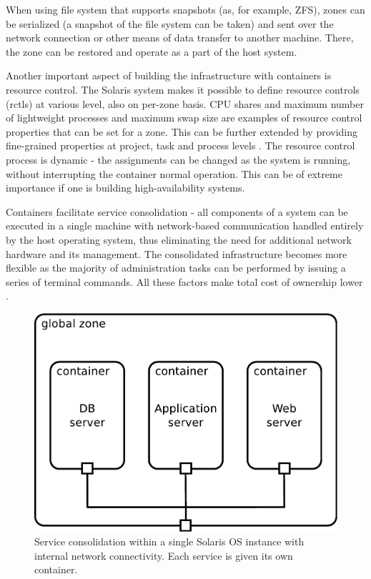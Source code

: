 \documentclass[11pt]{book}
\begin{document}
        When using file system that supports snapshots (as, for example, ZFS), zones can be
        serialized (a snapshot of the file system can be taken) and sent over the network connection or other means of
        data transfer to another machine. There, the zone can be restored and operate as a part of the host system.

        Another important aspect of building the infrastructure with containers is resource control. The Solaris system
        makes it possible to define resource controls (rctls) at various level, also on per-zone basis. CPU shares and
        maximum number of lightweight processes and maximum swap size are examples of resource control properties that
        can be set for a zone. This can be further extended by providing fine-grained properties at project, task and
        process levels \cite{sag}. The resource control process is dynamic - the assignments can be changed as the
        system is running, without interrupting the container normal operation. This can be of extreme importance if one
        is building high-availability systems.

        Containers facilitate service consolidation - all components of a system can be executed in a single machine
        with network-based communication handled entirely by the host operating system, thus eliminating the need for
        additional network hardware and its management. The consolidated infrastructure becomes more flexible as the
        majority of administration tasks can be performed by issuing a series of terminal commands. All these factors
        make total cost of ownership lower \cite{price}.

        \begin{figure}[H]
          \begin{center}
            \includegraphics[width=.7\textwidth]{img/solaris/consolidation.pdf}
          \end{center}

          \caption{Service consolidation within a single Solaris OS instance with internal network connectivity. Each
          service is given its own container.}
        \end{figure}
\end{document}
